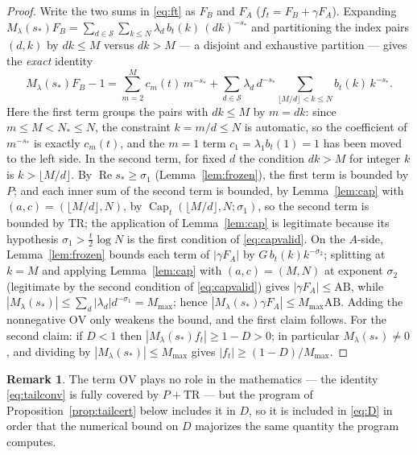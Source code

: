 \documentclass[11pt]{article}
\theoremstyle{definition}
\newtheorem{remark}[theorem]{Remark}
\newcommand{\calS}{\mathcal{S}}
\newcommand{\CapT}{\operatorname{Cap}}
\DeclareMathOperator{\Rea}{Re}
\begin{document}
\begin{proof}
Write the two sums in \eqref{eq:ft} as $F_B$ and $F_A$
($f_t=F_B+\gamma F_A$). Expanding
$M_\lambda(s_*)F_B=\sum_{d\in\calS}\sum_{k\le N}
\lambda_d\,b_t(k)\,(dk)^{-s_*}$ and partitioning the index pairs
$(d,k)$ by $dk\le M$ versus $dk>M$ --- a disjoint and exhaustive
partition --- gives the \emph{exact} identity
\begin{equation}\label{eq:tailconv}
M_\lambda(s_*)F_B-1
=\sum_{m=2}^{M}c_m(t)\,m^{-s_*}
+\sum_{d\in\calS}\lambda_d\,d^{-s_*}
\sum_{\lfloor M/d\rfloor<k\le N}b_t(k)\,k^{-s_*} .
\end{equation}
Here the first term groups the pairs with $dk\le M$ by $m=dk$: since
$m\le M<N_*\le N$, the constraint $k=m/d\le N$ is automatic, so the
coefficient of $m^{-s_*}$ is exactly $c_m(t)$, and the $m=1$ term
$c_1=\lambda_1b_t(1)=1$ has been moved to the left side. In the
second term, for fixed $d$ the condition $dk>M$ for integer $k$ is
$k>\lfloor M/d\rfloor$. By $\Rea s_*\ge\sigma_1$
(Lemma~\ref{lem:frozen}), the first term is bounded by $P$; and
each inner sum of the second term is bounded, by
Lemma~\ref{lem:cap} with $(a,c)=(\lfloor M/d\rfloor,N)$, by
$\CapT_t(\lfloor M/d\rfloor,N;\sigma_1)$, so the second term is
bounded by $\mathrm{TR}$; the application of Lemma~\ref{lem:cap} is
legitimate because its hypothesis $\sigma_1>\frac t2\log N$ is the
first condition of \eqref{eq:capvalid}. On the $A$-side,
Lemma~\ref{lem:frozen} bounds each term of $|\gamma F_A|$ by
$G\,b_t(k)k^{-\sigma_2}$; splitting at $k=M$ and applying
Lemma~\ref{lem:cap} with $(a,c)=(M,N)$ at exponent $\sigma_2$
(legitimate by the second condition of \eqref{eq:capvalid}) gives
$|\gamma F_A|\le\mathrm{AB}$, while
$|M_\lambda(s_*)|\le\sum_d|\lambda_d|d^{-\sigma_1}=M_{\max}$;
hence $|M_\lambda(s_*)\gamma F_A|\le M_{\max}\mathrm{AB}$. Adding
the nonnegative $\mathrm{OV}$ only weakens the bound, and the first
claim follows. For the second claim: if $D<1$ then
$|M_\lambda(s_*)f_t|\ge1-D>0$; in particular
$M_\lambda(s_*)\neq0$, and dividing by
$|M_\lambda(s_*)|\le M_{\max}$ gives
$|f_t|\ge(1-D)/M_{\max}$.
\end{proof}

\begin{remark}
The term $\mathrm{OV}$ plays no role in the mathematics --- the
identity \eqref{eq:tailconv} is fully covered by $P+\mathrm{TR}$ ---
but the program of Proposition~\ref{prop:tailcert} below includes
it in $D$, so it is included in \eqref{eq:D} in order that the
numerical bound on $D$ majorizes the same quantity the program
computes.
\end{remark}
\end{document}
